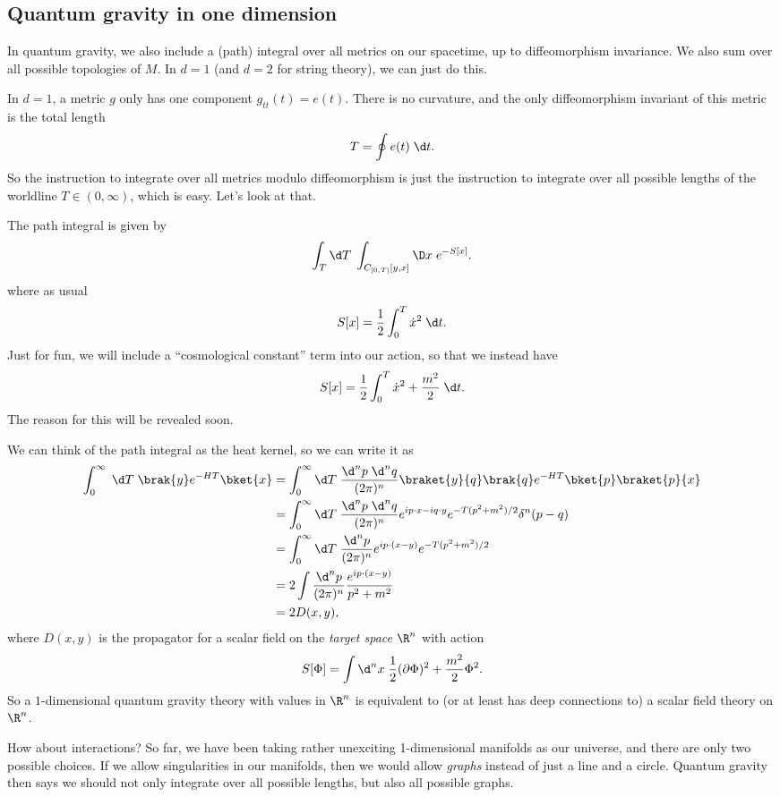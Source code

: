 \documentclass[a4paper]{article}
\begin{document}
\subsection{Quantum gravity in one dimension}
In quantum gravity, we also include a (path) integral over all metrics on our spacetime, up to diffeomorphism invariance. We also sum over all possible topologies of $M$. In $d = 1$ (and $d = 2$ for string theory), we can just do this.

In $d = 1$, a metric $g$ only has one component $g_{tt}(t) = e(t)$. There is no curvature, and the only diffeomorphism invariant of this metric is the total length
\[
  T = \oint e(t) \;\d t.
\]
So the instruction to integrate over all metrics modulo diffeomorphism is just the instruction to integrate over all possible lengths of the worldline $T \in (0, \infty)$, which is easy. Let's look at that.

The path integral is given by
\[
  \int_T \d T \;\int_{C_{[0, T]} [y, x]} \D x\; e^{-S[x]}.
\]
where as usual
\[
  S[x] = \frac{1}{2} \int_0^T \dot{x}^2 \;\d t.
\]
Just for fun, we will include a ``cosmological constant'' term into our action, so that we instead have
\[
  S[x] = \frac{1}{2} \int_0^T \dot{x}^2 + \frac{m^2}{2}\;\d t.
\]
The reason for this will be revealed soon.

We can think of the path integral as the heat kernel, so we can write it as
\begin{align*}
  \int_0^\infty\; \d T\; \brak{y} e^{-HT} \bket{x} &= \int_0^\infty \d T\; \frac{\d^n p\; \d^n q}{ (2\pi)^n} \braket{y}{q} \brak{q} e^{-HT}\bket{p} \braket{p}{x}\\
  &= \int_0^\infty \d T\; \frac{\d^n p\; \d ^n q}{(2\pi)^n} e^{ip\cdot x - i q \cdot y} e^{-T(p^2 + m^2)/2} \delta^n(p - q)\\
  &= \int_0^\infty \d T\; \frac{\d^n p}{(2\pi)^n} e^{ip\cdot (x - y)} e^{-T(p^2 + m^2)/2}\\
  &= 2 \int \frac{\d^n p}{(2\pi)^n} \frac{e^{ip\cdot (x - y)}}{p^2 + m^2}\\
  &= 2 D(x, y),
\end{align*}
where $D(x, y)$ is the propagator for a scalar field on the \emph{target space} $\R^n$ with action
\[
  S[\Phi] = \int \d^n x \; \frac{1}{2} (\partial \Phi)^2 + \frac{m^2}{2} \Phi^2.
\]
So a $1$-dimensional quantum gravity theory with values in $\R^n$ is equivalent to (or at least has deep connections to) a scalar field theory on $\R^n$.

How about interactions? So far, we have been taking rather unexciting 1-dimensional manifolds as our universe, and there are only two possible choices. If we allow singularities in our manifolds, then we would allow \emph{graphs} instead of just a line and a circle. Quantum gravity then says we should not only integrate over all possible lengths, but also all possible graphs.
\end{document}
